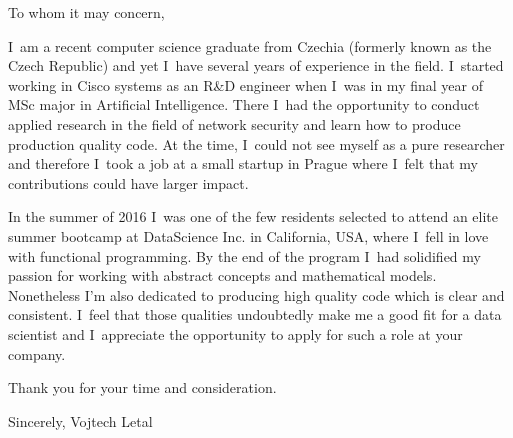 \documentclass[12pt]{article}
\begin{document}
To whom it may concern,


I~am a recent computer science graduate from Czechia (formerly known as the Czech Republic) and yet I~have several years of experience in the field. I~started working in Cisco systems as an R\&D engineer when I~was in my final year of MSc major in Artificial Intelligence. There I~had the opportunity to conduct applied research in the field of network security and learn how to produce production quality code. At the time, I~could not see myself as a pure researcher and therefore I~took a job at a small startup in Prague where I~felt that my contributions could have larger impact.


In the summer of 2016 I~was one of the few residents selected to attend an elite summer bootcamp at DataScience Inc. in California, USA, where I~fell in love with functional programming. By the end of the program I~had solidified my passion for working with abstract concepts and mathematical models. Nonetheless I’m also dedicated to producing high quality code which is clear and consistent. I~feel that those qualities undoubtedly make me a good fit for a data scientist and I~appreciate the opportunity to apply for such a role at your company.


Thank you for your time and consideration.


Sincerely,
Vojtech Letal
\end{document}

